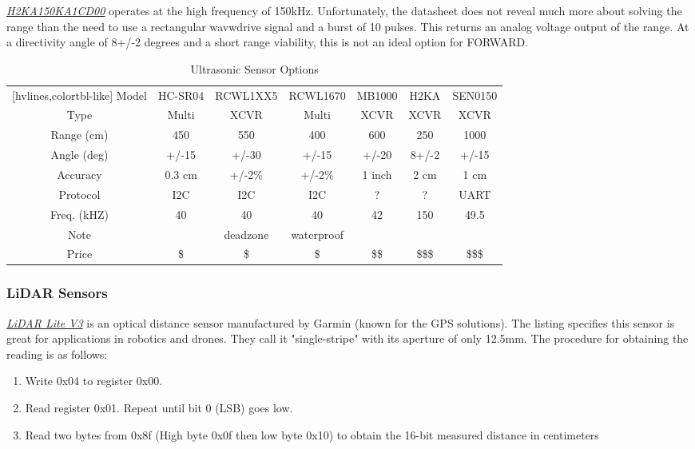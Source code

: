 \noindent \underline{\textit{H2KA150KA1CD00}} operates at the high frequency of 150kHz. Unfortunately, the datasheet does not reveal much more about solving the range than the need to use a rectangular wavwdrive signal and a burst of 10 pulses. This returns an analog voltage output of the range. At a directivity angle of 8+/-2 degrees and a short range viability, this is not an ideal option for FORWARD.\\

\begin{table}[H]
	\centering
	\setlength{\tabcolsep}{5pt} %
	\renewcommand{\arraystretch}{1.5} %
	\begin{NiceTabular}{ccccccc}[hvlines,colortbl-like]
		\CodeBefore
		\Body
		Model       & HC-SR04 & RCWL1XX5 & RCWL1670   & MB1000 & H2KA  & SEN0150 \\
		Type        & Multi   & XCVR     & Multi      & XCVR   & XCVR  & XCVR    \\
		Range (cm)  & 450     & 550      & 400        & 600    & 250   & 1000    \\
		Angle (deg) & +/-15   & +/-30    & +/-15      & +/-20  & 8+/-2 & +/-15   \\
		Accuracy    & 0.3 cm  & +/-2\%   & +/-2\%     & 1 inch & 2 cm  & 1 cm    \\
		Protocol    & I2C     & I2C      & I2C        & ?      & ?     & UART    \\
		Freq. (kHZ) & 40      & 40       & 40         & 42     & 150   & 49.5    \\
		Note        &         & deadzone & waterproof &        &       &         \\
		Price       & \$      & \$       & \$         & \$\$   & \$\$\$& \$\$\$
	\end{NiceTabular}
	\caption{\label{fig:compareUltrasonic}Ultrasonic Sensor Options}
\end{table}

\subsubsection{LiDAR Sensors}
\noindent \underline{\textit{LiDAR Lite V3}} is an optical distance sensor manufactured by Garmin (known for the GPS solutions). The listing specifies this sensor is great for applications in robotics and drones. They call it "single-stripe" with its aperture of only 12.5mm. The procedure for obtaining the reading is as follows:
\begin{enumerate}
	\item Write 0x04 to register 0x00.
	\item Read register 0x01. Repeat until bit 0 (LSB) goes low.
	\item Read two bytes from 0x8f (High byte 0x0f then low byte 0x10) to obtain the 16-bit measured distance in centimeters
\end{enumerate}

